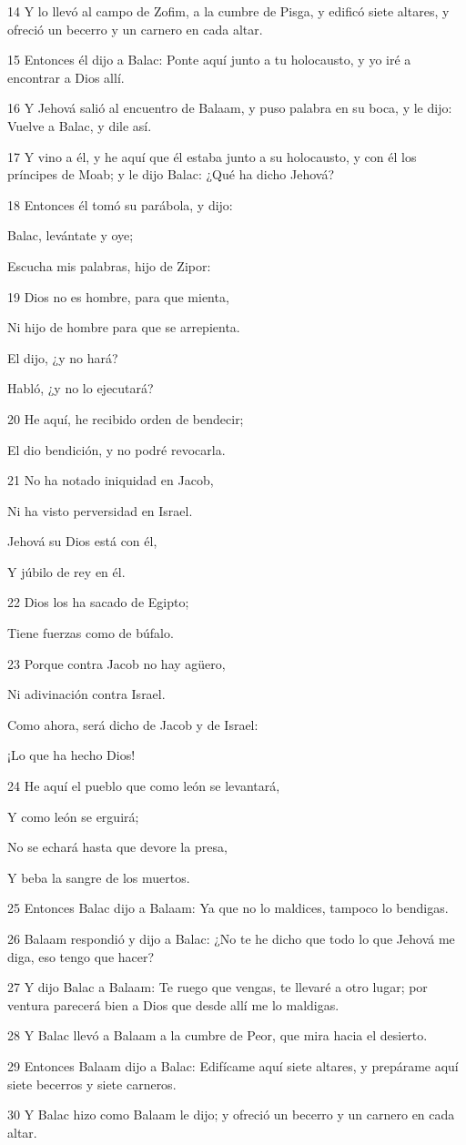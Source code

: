 \par 14 Y lo llevó al campo de Zofim, a la cumbre de Pisga, y edificó siete altares, y ofreció un becerro y un carnero en cada altar.
\par 15 Entonces él dijo a Balac: Ponte aquí junto a tu holocausto, y yo iré a encontrar a Dios allí.
\par 16 Y Jehová salió al encuentro de Balaam, y puso palabra en su boca, y le dijo: Vuelve a Balac, y dile así.
\par 17 Y vino a él, y he aquí que él estaba junto a su holocausto, y con él los príncipes de Moab; y le dijo Balac: ¿Qué ha dicho Jehová?
\par 18 Entonces él tomó su parábola, y dijo:
\par Balac, levántate y oye;
\par Escucha mis palabras, hijo de Zipor:
\par 19 Dios no es hombre, para que mienta,
\par Ni hijo de hombre para que se arrepienta.
\par El dijo, ¿y no hará?
\par Habló, ¿y no lo ejecutará?
\par 20 He aquí, he recibido orden de bendecir;
\par El dio bendición, y no podré revocarla.
\par 21 No ha notado iniquidad en Jacob,
\par Ni ha visto perversidad en Israel.
\par Jehová su Dios está con él,
\par Y júbilo de rey en él.
\par 22 Dios los ha sacado de Egipto;
\par Tiene fuerzas como de búfalo.
\par 23 Porque contra Jacob no hay agüero,
\par Ni adivinación contra Israel.
\par Como ahora, será dicho de Jacob y de Israel:
\par ¡Lo que ha hecho Dios!
\par 24 He aquí el pueblo que como león se levantará,
\par Y como león se erguirá;
\par No se echará hasta que devore la presa,
\par Y beba la sangre de los muertos.
\par 25 Entonces Balac dijo a Balaam: Ya que no lo maldices, tampoco lo bendigas.
\par 26 Balaam respondió y dijo a Balac: ¿No te he dicho que todo lo que Jehová me diga, eso tengo que hacer?
\par 27 Y dijo Balac a Balaam: Te ruego que vengas, te llevaré a otro lugar; por ventura parecerá bien a Dios que desde allí me lo maldigas.
\par 28 Y Balac llevó a Balaam a la cumbre de Peor, que mira hacia el desierto.
\par 29 Entonces Balaam dijo a Balac: Edifícame aquí siete altares, y prepárame aquí siete becerros y siete carneros.
\par 30 Y Balac hizo como Balaam le dijo; y ofreció un becerro y un carnero en cada altar.


